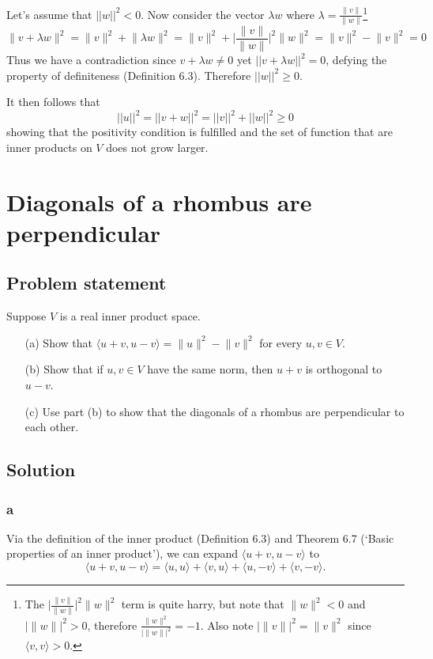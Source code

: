 \documentclass{article}
\providecommand{\abs}[1]{\lvert#1\rvert} \providecommand{\norm}[1]{\lVert#1\rVert}
\begin{document}
Let's assume that $||w||^2 < 0$. 
Now consider the vector $\lambda w$ where $\lambda=\frac{\norm{v}}{\norm{w}}$\footnote{
The $\abs{\frac{\norm{v}}{\norm{w}}}^2 \norm{w}^2$ term is quite harry, but note that $\norm{w}^2 < 0$ and $\abs{\norm{w}}^2 > 0$, therefore $\frac{\norm{w}^2}{\abs{\norm{w}}^2} = -1 $. Also note $\abs{\norm{v}}^2 = \norm{v}^2$ since $\langle v, v\rangle > 0$.
}
\[\norm{v+\lambda w}^2=\norm{v}^2+\norm{\lambda w}^2 = \norm{v}^2+\abs{\frac{\norm{v}}{\norm{w}}}^2 \norm{w}^2 = \norm{v}^2 - \norm{v}^2 = 0 \]
Thus we have a contradiction since $v+\lambda w\neq0$ yet $||v+\lambda w||^2=0$, defying the property of definiteness (Definition 6.3). Therefore $||w||^2 \geq 0$.

It then follows that 
\[||u||^2 = ||v+w||^2=||v||^2+||w||^2 \geq 0\]
showing that the positivity condition is fulfilled and the set of function that are inner products on $V$ does not grow larger.

\clearpage

\section{Diagonals of a rhombus are perpendicular}
\subsection*{Problem statement}
Suppose $V$ is a real inner product space.
\begin{itemize}
    \item[(a)] Show that $\langle u+v,u-v\rangle=\norm{u}^2 - \norm{v}^2$ for every $u,v\in V$.
    \item[(b)] Show that if $u,v\in V$ have the same norm, then $u+v$ is orthogonal to $u-v$.
    \item[(c)] Use part (b) to show that the diagonals of a rhombus are perpendicular to each other.
\end{itemize}

\subsection*{Solution}

\subsubsection*{a}
Via the definition of the inner product (Definition 6.3) and Theorem 6.7 (`Basic properties of an inner product'), we can expand $\langle u+v,u-v\rangle$ to
\[\langle u+v,u-v\rangle=\langle u,u\rangle+\langle v,u\rangle + \langle u,-v\rangle + \langle v,-v\rangle.\]
\end{document}
